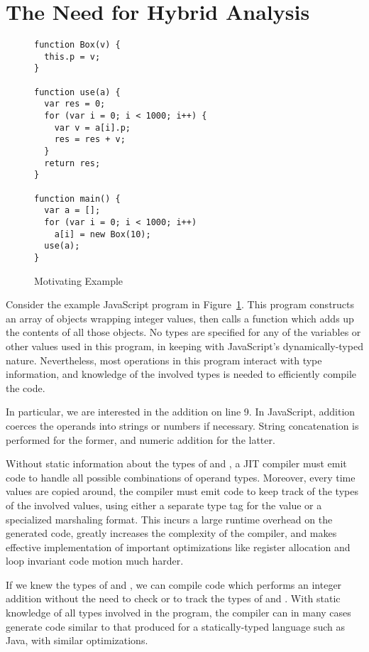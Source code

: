 
\section{The Need for Hybrid Analysis}
\label{sec:example}

\begin{figure}
\begin{lstlisting}[xleftmargin=18pt]
function Box(v) {
  this.p = v;
}

function use(a) {
  var res = 0;
  for (var i = 0; i < 1000; i++) {
    var v = a[i].p;
    res = res + v;
  }
  return res;
}

function main() {
  var a = [];
  for (var i = 0; i < 1000; i++)
    a[i] = new Box(10);
  use(a);
}
\end{lstlisting}
\caption{Motivating Example}
\label{fig:motivating-example}
\end{figure}

Consider the example JavaScript program in Figure~\ref{fig:motivating-example}.
This program constructs an array of  objects wrapping integer
values, then calls a  function which adds up the contents of all
those  objects.
No types are specified for any of the variables or other values used
in this program, in keeping with JavaScript's dynamically-typed nature.
Nevertheless, most operations in this program interact with type information,
and knowledge of the involved types is needed to efficiently compile the code.

In particular, we are interested in the addition  on line 9.  In
JavaScript, addition coerces the operands into strings or numbers if
necessary. String concatenation is performed for the former, and numeric
addition for the latter.

Without static information about the types of  and ,
a JIT compiler must emit code to handle all possible combinations of
operand types.
Moreover, every time values are copied around, the compiler must emit
code to keep track of the types of the involved values, using either
a separate type tag for the value or a specialized marshaling format.
This incurs a large runtime overhead on the generated code,
greatly increases the complexity of the compiler,
and makes effective implementation of important optimizations like
register allocation and loop invariant code motion much harder.

If we knew the types of  and , we can compile
code which performs an integer addition without the need to check or
to track the types of  and .
With static knowledge of all types involved in the program, the compiler can
in many cases generate code similar to that produced for a statically-typed
 language such as Java, with similar optimizations.

